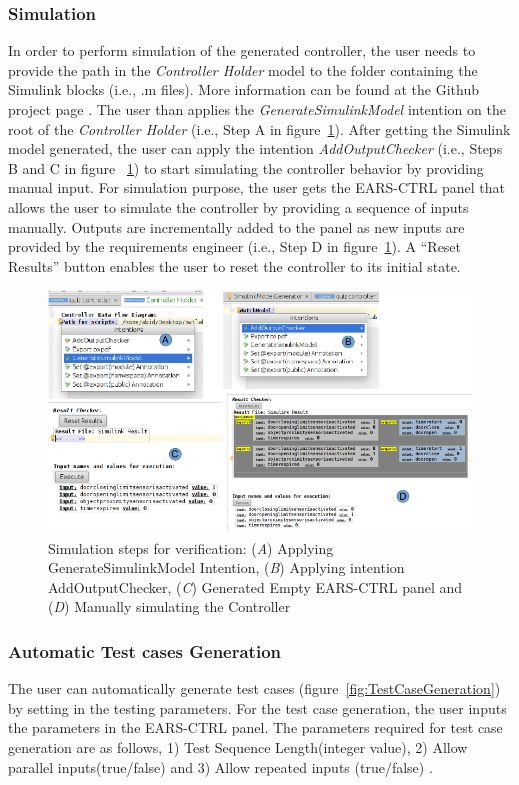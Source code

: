 \subsubsection{Simulation}
\vspace{-.2cm}
In order to perform simulation of the generated controller, the user needs to
provide the path in the \emph{Controller
Holder} model to the folder containing the
Simulink blocks (i.e., .m files). More information can be found at the Github
project page \cite{EARSProject}. The user than applies the \emph{GenerateSimulinkModel} intention on the root of the \emph{Controller
Holder} (i.e., Step A in figure~\ref{fig:SimulationSteps}). After getting the
Simulink model generated, the user can apply the intention
\emph{AddOutputChecker} (i.e., Steps B and C in figure
~\ref{fig:SimulationSteps}) to start simulating the controller behavior by
providing manual input. For simulation purpose, the user gets the
\textsf{EARS-CTRL} panel that allows the user to simulate the controller by providing a sequence of inputs manually.
Outputs are incrementally added to the panel as new inputs are provided by the
requirements engineer (i.e., Step D in figure~\ref{fig:SimulationSteps}).
A \textsf{“Reset Results”} button enables the user to reset the
controller to its initial state.
\begin{figure}[!h]
\centering
\includegraphics[width=1\textwidth]{./images/Simulation_Steps.png}
\caption{Simulation steps for verification: (\emph{A}) Applying
GenerateSimulinkModel Intention, (\emph{B}) Applying intention AddOutputChecker,
(\emph{C}) Generated Empty \textsf{EARS-CTRL} panel and (\emph{D}) Manually
simulating the Controller}
\label{fig:SimulationSteps}
\end{figure}
\vspace{-.3cm}
\subsubsection{Automatic Test cases Generation} 
\vspace{-.5cm}
The user can automatically generate test cases
(figure~\ref{fig:TestCaseGeneration}) by setting in the testing parameters.
For the test case generation, the user inputs the
parameters in the \textsf{EARS-CTRL} panel.
The parameters required for test case generation are as follows, 1) \textsf{Test
Sequence Length(integer value)}, 2) \textsf{Allow parallel inputs(true/false)} and 3) \textsf{Allow repeated inputs (true/false)} .
